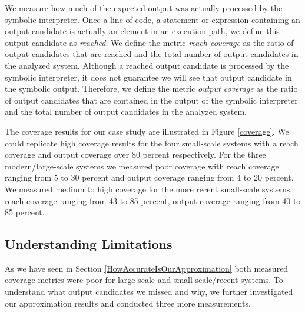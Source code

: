\documentclass[sigconf]{acmart}
\begin{document}
We measure how much of the expected output was actually processed by the
symbolic interpreter.  Once a line of code, a statement or expression
containing an output candidate is actually an element in an execution path, we
define this output candidate as \emph{reached}. We define the metric \emph{reach
coverage} as the ratio of output candidates that are reached and the total
number of output candidates in the analyzed system. Although a reached output
candidate is processed by the symbolic interpreter, it does not guarantee we
will see that output candidate in the symbolic output. Therefore, we define the
metric \emph{output coverage} as the ratio of output candidates that are
contained in the output of the symbolic interpreter and the total number of
output candidates in the analyzed system.  

The coverage results for our case study are illustrated in Figure
\ref{coverage}. We could replicate high coverage results for the four small-scale systems with a reach
coverage and output coverage over 80 percent respectively. For the three
modern/large-scale systems we measured poor coverage with reach coverage
ranging from 5 to 30 percent and output coverage ranging from 4 to 20 percent.
We measured medium to high coverage for the more recent small-scale systems:
reach coverage ranging from 43 to 85 percent, output coverage ranging from 40
to 85 percent.

\subsection{Understanding Limitations} \label{sec:understanding_limitations}
As we have seen in Section \ref{HowAccurateIsOurApproximation} both measured
coverage metrics were poor for large-scale and small-scale/recent systems. To
understand what output candidates we missed and why, we further investigated
our approximation results and conducted three more measurements.
\end{document}
